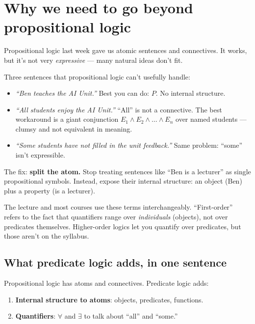 \documentclass[11pt, a4paper]{article}
\begin{document}
\section{Why we need to go beyond propositional logic}

Propositional logic last week gave us atomic sentences and connectives. It works, but it's not very \emph{expressive} — many natural ideas don't fit.

Three sentences that propositional logic can't usefully handle:

\begin{itemize}
  \item \textit{``Ben teaches the AI Unit.''} \quad Best you can do: $P$. No internal structure.
  \item \textit{``All students enjoy the AI Unit.''} \quad ``All'' is not a connective. The best workaround is a giant conjunction $E_1 \land E_2 \land \dots \land E_n$ over named students — clumsy and not equivalent in meaning.
  \item \textit{``Some students have not filled in the unit feedback.''} \quad Same problem: ``some'' isn't expressible.
\end{itemize}

The fix: \textbf{split the atom.} Stop treating sentences like ``Ben is a lecturer'' as single propositional symbols. Instead, expose their internal structure: an object (Ben) plus a property (is a lecturer).

\begin{notebox}[: ``predicate logic'' = ``first-order logic'']
The lecture and most courses use these terms interchangeably. ``First-order'' refers to the fact that quantifiers range over \emph{individuals} (objects), not over predicates themselves. Higher-order logics let you quantify over predicates, but those aren't on the syllabus.
\end{notebox}

\subsection{What predicate logic adds, in one sentence}

Propositional logic has atoms and connectives. Predicate logic adds:
\begin{enumerate}
  \item \textbf{Internal structure to atoms}: objects, predicates, functions.
  \item \textbf{Quantifiers}: $\forall$ and $\exists$ to talk about ``all'' and ``some.''
\end{enumerate}
\end{document}
